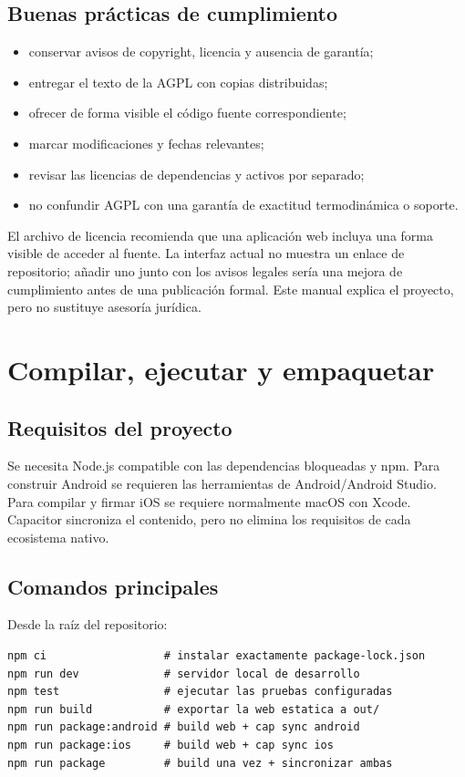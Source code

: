 \documentclass[11pt,a4paper,oneside]{article}
\begin{document}
\subsection{Buenas pr\'acticas de cumplimiento}

\begin{itemize}
  \item conservar avisos de copyright, licencia y ausencia de garant\'ia;
  \item entregar el texto de la AGPL con copias distribuidas;
  \item ofrecer de forma visible el c\'odigo fuente correspondiente;
  \item marcar modificaciones y fechas relevantes;
  \item revisar las licencias de dependencias y activos por separado;
  \item no confundir AGPL con una garant\'ia de exactitud termodin\'amica o soporte.
\end{itemize}

El archivo de licencia recomienda que una aplicaci\'on web incluya una forma visible de acceder al fuente. La interfaz actual no muestra un enlace de repositorio; a\~nadir uno junto con los avisos legales ser\'ia una mejora de cumplimiento antes de una publicaci\'on formal. Este manual explica el proyecto, pero no sustituye asesor\'ia jur\'idica.

\section{Compilar, ejecutar y empaquetar}

\subsection{Requisitos del proyecto}

Se necesita Node.js compatible con las dependencias bloqueadas y npm. Para construir Android se requieren las herramientas de Android/Android Studio. Para compilar y firmar iOS se requiere normalmente macOS con Xcode. Capacitor sincroniza el contenido, pero no elimina los requisitos de cada ecosistema nativo.

\subsection{Comandos principales}

Desde la ra\'iz del repositorio:

\begin{lstlisting}
npm ci                  # instalar exactamente package-lock.json
npm run dev             # servidor local de desarrollo
npm test                # ejecutar las pruebas configuradas
npm run build           # exportar la web estatica a out/
npm run package:android # build web + cap sync android
npm run package:ios     # build web + cap sync ios
npm run package         # build una vez + sincronizar ambas
\end{lstlisting}
\end{document}
